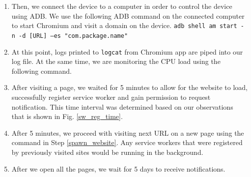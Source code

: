 \begin{enumerate}
    \item \label{spawn_website} Then, we connect the device to a computer in order to control the device using ADB. We use the following ADB command on the connected computer to start Chromium and visit a domain on the device. 
        \texttt{adb shell am start -n  -d [URL] --es  "com.package.name"}
    \item At this point, logs printed to \texttt{logcat} from Chromium app are piped into our log file. At the same time, we are monitoring the CPU load using the following command.\\
    \item After visiting a page, we waited for 5 minutes to allow for the website to load, successfully register service worker and gain permission to request notification. This time interval was determined based on our observations that is shown in Fig. \ref{sw_reg_time}. 
    \item After 5 minutes, we proceed with visiting next URL on a new page using the command in Step \ref{spawn_website}. Any service workers that were registered by previously visited sites would be running in the background.
    \item After we open all the pages, we wait for 5 days to receive notifications. 
\end{enumerate}

